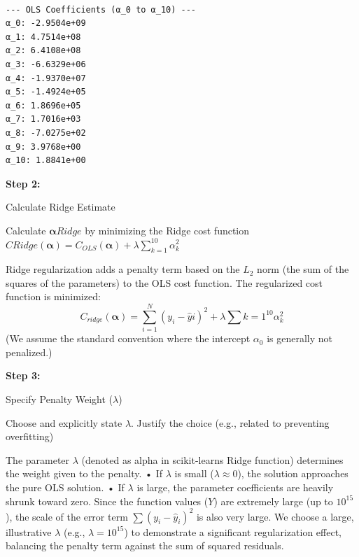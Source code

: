 \begin{verbatim}

--- OLS Coefficients (α_0 to α_10) ---
α_0: -2.9504e+09
α_1: 4.7514e+08
α_2: 6.4108e+08
α_3: -6.6329e+06
α_4: -1.9370e+07
α_5: -1.4924e+05
α_6: 1.8696e+05
α_7: 1.7016e+03
α_8: -7.0275e+02
α_9: 3.9768e+00
α_10: 1.8841e+00
\end{verbatim}

\leavevmode{}%
\textbf{Step 2:}

Calculate Ridge Estimate

Calculate \(\boldsymbol{\alpha}{Ridge}\) by minimizing the Ridge cost
function
\(C{Ridge}(\boldsymbol{\alpha}) = C_{OLS}(\boldsymbol{\alpha}) + \lambda \sum_{k=1}^{10} \alpha_k^2\)

Ridge regularization adds a penalty term based on the \(L_2\) norm (the
sum of the squares of the parameters) to the OLS cost function. The
regularized cost function is minimized:
\[ C_{ridge}(\boldsymbol{\alpha}) = \sum_{i=1}^{N} (y_i - \hat{y}i)^2 + \lambda \sum{k=1}^{10} \alpha_k^2 \]
(We assume the standard convention where the intercept \(\alpha_0\) is
generally not penalized.)

\leavevmode{}%
\textbf{Step 3:}

Specify Penalty Weight (\(\lambda\))

Choose and explicitly state \(\lambda\). Justify the choice (e.g.,
related to preventing overfitting)

The parameter \(\lambda\) (denoted as alpha in
scikit-learn\textquotesingle s Ridge function) determines the weight
given to the penalty. • If \(\lambda\) is small (\(\lambda \approx 0\)),
the solution approaches the pure OLS solution. • If \(\lambda\) is
large, the parameter coefficients are heavily shrunk toward zero. Since
the function values (\(Y\)) are extremely large (up to \(10^{15}\)), the
scale of the error term \(\sum (y_i - \hat{y}_i)^2\) is also very large.
We choose a large, illustrative \(\lambda\) (e.g., \(\lambda=10^{15}\))
to demonstrate a significant regularization effect, balancing the
penalty term against the sum of squared residuals.

